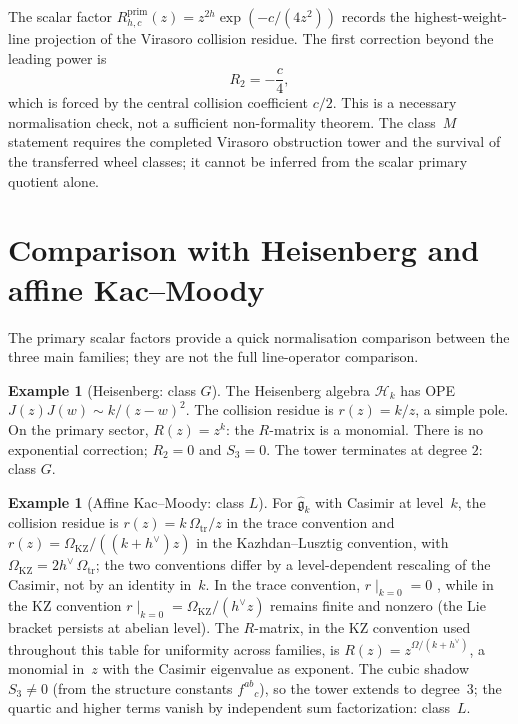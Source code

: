 \documentclass[11pt]{article}
\theoremstyle{definition}
\newtheorem{example}[theorem]{Example}
\theoremstyle{remark}
\newcommand{\cH}{\mathcal{H}}
\newcommand{\fg}{\mathfrak{g}}
\numberwithin{equation}{section}
\begin{document}
The scalar factor
$R^{\mathrm{prim}}_{h,c}(z)=z^{2h}\exp(-c/(4z^2))$ records the
highest-weight-line projection of the Virasoro collision residue. The
first correction beyond the leading power is
\begin{equation}\label{eq:R2}
R_2 = -\frac{c}{4},
\end{equation}
which is forced by the central collision coefficient \(c/2\). This is
a necessary normalisation check, not a sufficient non-formality
theorem.  The class~$M$ statement requires the completed Virasoro
obstruction tower and the survival of the transferred wheel classes;
it cannot be inferred from the scalar primary quotient alone.

\section{Comparison with Heisenberg and affine Kac--Moody}
\label{sec:comparison}

The primary scalar factors provide a quick normalisation comparison
between the three main families; they are not the full line-operator
comparison.

\begin{example}[Heisenberg: class $G$]\label{ex:heisenberg}
The Heisenberg algebra $\cH_k$ has OPE
$J(z)J(w) \sim k/(z-w)^2$. The collision residue is
$r(z) = k/z$, a simple pole. On the primary sector,
$R(z) = z^k$: the $R$-matrix is a monomial. There is no
exponential correction; $R_2 = 0$ and $S_3 = 0$.
The tower terminates at degree $2$: class $G$.
\end{example}

\begin{example}[Affine Kac--Moody: class $L$]\label{ex:km}
For $\widehat{\fg}_k$ with Casimir at level~$k$, the collision
residue is $r(z) = k\,\Omega_{\mathrm{tr}}/z$ in the trace
convention and $r(z) = \Omega_{\mathrm{KZ}}/((k+h^\vee)z)$ in
the Kazhdan--Lusztig convention, with $\Omega_{\mathrm{KZ}} =
2 h^\vee\, \Omega_{\mathrm{tr}}$; the two conventions differ
by a level-dependent rescaling of the Casimir, not by an
identity in~$k$. In the trace convention, $r\!\mid_{k=0}\!=0$
, while in the KZ convention $r\!\mid_{k=0}\!=\Omega_{\mathrm{KZ}}/(h^\vee z)$
remains finite and nonzero (the Lie bracket persists at abelian
level). The $R$-matrix, in the KZ convention used throughout
this table for uniformity across families, is
$R(z) = z^{\Omega/(k+h^\vee)}$, a monomial in~$z$ with the
Casimir eigenvalue as exponent. The cubic shadow $S_3 \neq 0$
(from the structure constants $f^{ab}{}_c$), so the tower
extends to degree~$3$; the quartic and higher terms vanish by
independent sum factorization: class~$L$.
\end{example}
\end{document}
